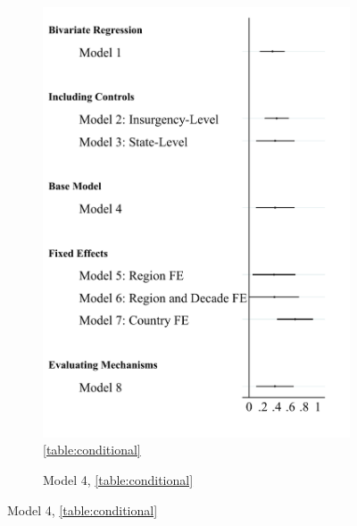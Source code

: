 \documentclass[12pt, letterpaper]{article}
\begin{document}
\begin{figure}[h]
\caption{\textbf{Secessionist Goals Predict Inclusive Services}}
\label{figure:coefmaincombined}
\centering
	\begin{subfigure}{0.45\textwidth}
    \centering
    \caption{\autoref{table:conditional}} \label{figure:coefmainpred}
    \includegraphics[width=\textwidth]{coefmainpred.pdf}
    \end{subfigure}
% 
	\begin{subfigure}{0.45\textwidth}
    \centering
    \caption{Model 4, \autoref{table:conditional}} \label{figure:mainwithcoef}

\end{subfigure}
\end{figure}
\end{document}
